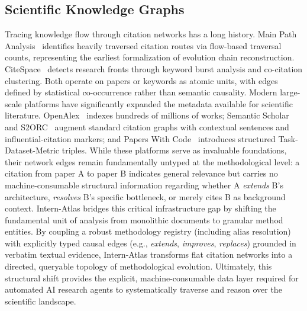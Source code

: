 \documentclass{llmxive}
\begin{document}
\subsection{Scientific Knowledge Graphs}
Tracing knowledge flow through citation networks has a long history. Main Path Analysis~\cite{hummon1989connectivity} identifies heavily traversed citation routes via flow-based traversal counts, representing the earliest formalization of evolution chain reconstruction. CiteSpace~\cite{chen2006citespace} detects research fronts through keyword burst analysis and co-citation clustering. Both operate on papers or keywords as atomic units, with edges defined by statistical co-occurrence rather than semantic causality.
Modern large-scale platforms have significantly expanded the metadata available for scientific literature. OpenAlex~\cite{priem2022openalex} indexes hundreds of millions of works; Semantic Scholar~\cite{ammar2018construction} and S2ORC~\cite{lo2020s2orc} augment standard citation graphs with contextual sentences and influential-citation markers; and Papers With Code~\cite{nanoresearch2026} introduces structured Task-Dataset-Metric triples. While these platforms serve as invaluable foundations, their network edges remain fundamentally untyped at the methodological level: a citation from paper A to paper B indicates general relevance but carries no machine-consumable structural information regarding whether A \textit{extends} B's architecture, \textit{resolves} B's specific bottleneck, or merely cites B as background context.
{Intern-Atlas} bridges this critical infrastructure gap by shifting the fundamental unit of analysis from monolithic documents to granular method entities. By coupling a robust methodology registry (including alias resolution) with explicitly typed causal edges (e.g., \textit{extends}, \textit{improves}, \textit{replaces}) grounded in verbatim textual evidence, Intern-Atlas transforms flat citation networks into a directed, queryable topology of methodological evolution. Ultimately, this structural shift provides the explicit, machine-consumable data layer required for automated AI research agents to systematically traverse and reason over the scientific landscape.
\end{document}
